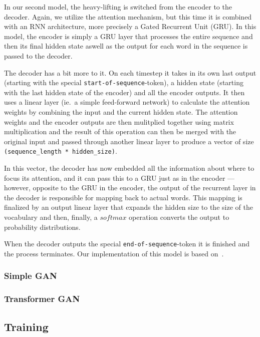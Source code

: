 \documentclass{article}
\begin{document}
In our second model, the heavy-lifting is switched from the encoder to the
decoder. Again, we utilize the attention mechanism, but this time it is combined
with an RNN architecture, more precisely a Gated Recurrent Unit (GRU). In this
model, the encoder is simply a GRU layer that processes the entire sequence and
then its final hidden state aswell as the output for each word in the sequence
is passed to the decoder.

The decoder has a bit more to it. On each timestep it takes in its own last
output (starting with the special \texttt{start-of-sequence}-token), a hidden
state (starting with the last hidden state of the encoder) and all the encoder
outputs. It then uses a linear layer (ie.\ a simple feed-forward network) to
calculate the attention weights by combining the input and the current hidden
state. The attention weights and the encoder outputs are then mulitplied
together using matrix multiplication and the result of this operation can then be
merged with the original input and passed through another linear layer to
produce a vector of size \texttt{(sequence\_length * hidden\_size)}.

In this vector, the decoder has now embedded all the information about where to
focus its attention, and it can pass this to a GRU just as in the encoder ---
however, opposite to the GRU in the encoder, the output of the recurrent layer
in the decoder is responsible for mapping back to actual words. This mapping is
finalized by an output linear layer that expands the hidden size to the size of
the vocabulary and then, finally, a $softmax$ operation converts the output to
probability distributions.

When the decoder outputs the special \texttt{end-of-sequence}-token it is
finished and the process terminates. Our implementation of this model is based
on~\cite{pytorchTutorialAtt}.


\subsubsection{Simple GAN}\label{sec:simpleGAN}


\subsubsection{Transformer GAN}\label{sec:simpleGAN}


\subsection{Training}\label{sec:training}
\end{document}
